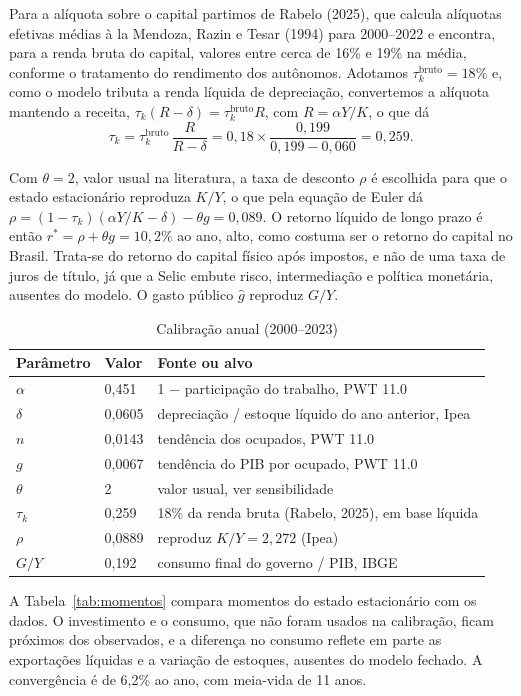 \documentclass[11pt,a4paper]{article}
\begin{document}
Para a alíquota sobre o capital partimos de Rabelo (2025), que calcula
alíquotas efetivas médias à la Mendoza, Razin e Tesar (1994) para 2000--2022 e
encontra, para a renda bruta do capital, valores entre cerca de 16\% e 19\% na
média, conforme o tratamento do rendimento dos autônomos. Adotamos
$\tau_k^{\text{bruto}}=18\%$ e, como o modelo tributa a renda líquida de
depreciação, convertemos a alíquota mantendo a receita,
$\tau_k(R-\delta)=\tau_k^{\text{bruto}}R$, com $R=\alpha Y/K$, o que dá
\begin{equation}
 \tau_k=\tau_k^{\text{bruto}}\,\frac{R}{R-\delta}=0{,}18\times\frac{0{,}199}{0{,}199-0{,}060}=0{,}259.
\end{equation}

Com $\theta=2$, valor usual na literatura, a taxa de desconto $\rho$ é
escolhida para que o estado estacionário reproduza $K/Y$, o que pela equação
de Euler dá $\rho=(1-\tau_k)(\alpha Y/K-\delta)-\theta g=0{,}089$. O retorno
líquido de longo prazo é então $r^*=\rho+\theta g=10{,}2\%$ ao ano, alto, como
costuma ser o retorno do capital no Brasil. Trata-se do retorno do capital
físico após impostos, e não de uma taxa de juros de título, já que a Selic
embute risco, intermediação e política monetária, ausentes do modelo. O gasto
público $\hat g$ reproduz $G/Y$.

\begin{table}[ht]
\centering
\caption{Calibração anual (2000--2023)}
\label{tab:calibracao}
\begin{tabular}{llp{9cm}}
\toprule
Parâmetro & Valor & Fonte ou alvo\\
\midrule
$\alpha$ & 0,451 & 1 $-$ participação do trabalho, PWT 11.0\\
$\delta$ & 0,0605 & depreciação / estoque líquido do ano anterior, Ipea\\
$n$ & 0,0143 & tendência dos ocupados, PWT 11.0\\
$g$ & 0,0067 & tendência do PIB por ocupado, PWT 11.0\\
$\theta$ & 2 & valor usual, ver sensibilidade\\
$\tau_k$ & 0,259 & 18\% da renda bruta (Rabelo, 2025), em base líquida\\
$\rho$ & 0,0889 & reproduz $K/Y=2{,}272$ (Ipea)\\
$G/Y$ & 0,192 & consumo final do governo / PIB, IBGE\\
\bottomrule
\end{tabular}
\end{table}

A Tabela~\ref{tab:momentos} compara momentos do estado estacionário com os
dados. O investimento e o consumo, que não foram usados na calibração, ficam
próximos dos observados, e a diferença no consumo reflete em parte as
exportações líquidas e a variação de estoques, ausentes do modelo fechado. A
convergência é de 6,2\% ao ano, com meia-vida de 11 anos.
\end{document}
